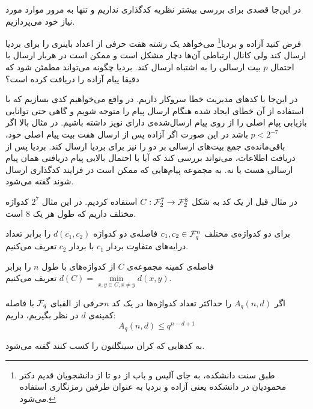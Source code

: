 در این‌جا قصدی برای بررسی بیشتر نظریه کدگذاری نداریم و تنها به مرور موارد مورد نیاز خود می‌پردازیم.
\begin{example}
	فرض کنید آزاده و بردیا\footnote{طبق سنت دانشکده، به جای آلیس و باب از دو تا از دانشجویان قدیم دکتر محمودیان در دانشکده یعنی آزاده و بردیا به عنوان طرفین رمزنگاری استفاده می‌شود.}
	 می‌خواهد یک رشته هفت حرفی از اعداد باینری را برای بردیا ارسال کند ولی کانال ارتباطی آن‌ها دچار مشکل است و ممکن است در هربار ارسال با احتمال
	$p$
	بیت ارسالی را به اشتباه ارسال کند. بردیا چگونه می‌تواند مطمئن شود که دقیقا پیام آزاده را دریافت کرده است؟
	
	در این‌جا با کدهای مدیریت خطا سروکار داریم. در واقع می‌خواهیم کدی بسازیم که با استفاده از آن خطای ایجاد شده هنگام ارسال پیام را متوجه شویم و گاهی حتی توانایی بازیابی پیام اصلی را از روی پیام ارسال‌شده‌ی دارای نویز داشته باشیم. در مثال بالا اگر
	$p < 2^{-7}$
	باشد در این صورت اگر آزاده پس از ارسال هفت بیت پیام اصلی خود، باقی‌مانده‌ی جمع بیت‌های ارسالی بر دو را نیز برای بردیا ارسال کند. بردیا پس از دریافت اطلاعات، می‌تواند بررسی کند که آیا با احتمال بالایی پیام دریافتی همان پیام ارسالی هست یا نه. به مجموعه‌ پیام‌هایی که ممکن است در فرایند کدگذاری ارسال شوند 
	گفته می‌شود.
	
	در مثال قبل از یک کد به شکل
	$C: \mathcal{F}_2^7 \rightarrow \mathcal{F}_2^8$
	استفاده کردیم. در این مثال
	$2^7$
	کدواژه مختلف داریم که طول هر یک
	$8$
	است.
\end{example}

\begin{definition}
	برای دو کدواژه‌ی مختلف
	$c_1, c_2 \in \mathcal{F}_q^n$
	فاصله‌ی دو کدواژه
	$d(c_1, c_2)$
	را برابر تعداد درایه‌های متفاوت بردار
	$c_1$
	با بردار
	$c_2$
	تعریف می‌کنیم.
	
	 فاصله‌‌ی کمینه مجموعه‌ی
	$C$
	از کدواژه‌های با طول
	$n$
	 را برابر
	$d(C) = \min\limits_{x, y \in C, x \ne y} d(x, y)$
	تعریف می‌کنیم.
\end{definition}

\begin{definition}
	اگر
	$A_q(n, d)$
	را حداکثر تعداد کدواژه‌ها در یک کد
	$n$حرفی
 از الفبای
	$\mathcal{F}_q$
	با فاصله کمینه‌ی 
	$d$
	در نظر بگیریم، داریم:
	\begin{equation}
		A_q(n, d) \leq q^{n - d + 1}
	\end{equation}
\end{definition}
\begin{definition}
	\label{def:mds}
	به کدهایی که کران سینگلتون را کسب کنند گفته می‌شود.
\end{definition}

